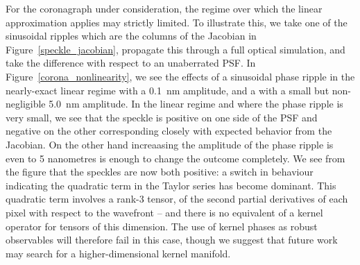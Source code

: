 \documentclass[modern]{aastex63}
\begin{document}



For the coronagraph under consideration, the regime over which the linear approximation applies may strictly limited. To illustrate this, we take one of the sinusoidal ripples which are the columns of the Jacobian in Figure~\ref{speckle_jacobian}, propagate this through a full optical simulation, and take the difference with respect to an unaberrated PSF. In Figure~\ref{corona_nonlinearity}, we see the effects of a sinusoidal phase ripple in the nearly-exact linear regime with a 0.1~nm amplitude, and a with a small but non-negligible 5.0~nm amplitude. In the linear regime and where the phase ripple is very small, we see that the speckle is positive on one side of the PSF and negative on the other corresponding closely with expected behavior from the Jacobian. On the other hand increaasing the amplitude of the phase ripple is even to  5 nanometres is enough to change the outcome completely. We see from the figure that the speckles are now both positive: a switch in behaviour indicating the quadratic term in the Taylor series has become dominant. This quadratic term involves a rank-3 tensor, of the second partial derivatives of each pixel with respect to the wavefront -- and there is no equivalent of a kernel operator for tensors of this dimension. The use of kernel phases as robust observables will therefore fail in this case, though we suggest that future work may search for a higher-dimensional kernel manifold. 
\end{document}
